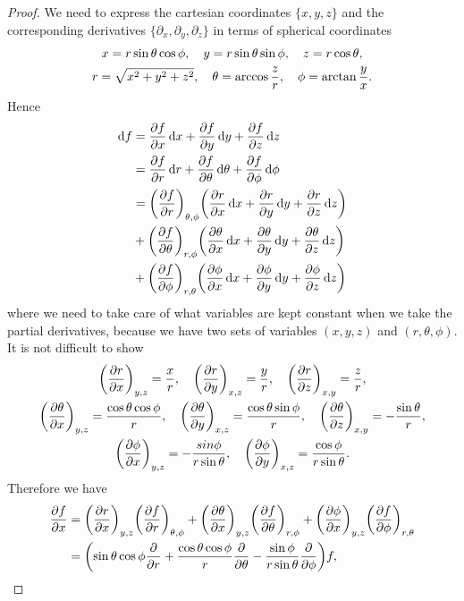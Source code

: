 \documentclass[10pt]{article}
\begin{document}
\begin{enumerate}[(a)]
	\begin{proof}
		We need to express the cartesian coordinates $\{x,y,z\}$ and the corresponding derivatives $\{\partial_x, \partial_y, \partial_z\}$ in terms of spherical coordinates
		\begin{gather*}
			x = r \sin{\theta} \cos{\phi}\qc y = r \sin{\theta}\sin{\phi}\qc z = r\cos{\theta}, \\
			r = \sqrt{x^2 + y^2 + z^2}\qc \theta = \arccos{\frac{z}{r}}\qc \phi = \arctan{\frac{y}{x}}.
		\end{gather*}
		Hence
		\begin{align*}
			\dd{f} &= \pdv{f}{x} \dd{x} + \pdv{f}{y} \dd{y} + \pdv{f}{z} \dd{z} \\
			&= \pdv{f}{r} \dd{r} + \pdv{f}{\theta} \dd{\theta} + \pdv{f}{\phi} \dd{\phi} \\
			&= \qty(\pdv{f}{r})_{\theta, \phi} \qty(\pdv{r}{x} \dd{x} + \pdv{r}{y} \dd{y} + \pdv{r}{z} \dd{z}) \\
			&+ \qty(\pdv{f}{\theta})_{r, \phi} \qty(\pdv{\theta}{x} \dd{x} + \pdv{\theta}{y} \dd{y} + \pdv{\theta}{z} \dd{z}) \\
			&+ \qty(\pdv{f}{\phi})_{r,\theta} \qty(\pdv{\phi}{x} \dd{x} + \pdv{\phi}{y} \dd{y} + \pdv{\phi}{z} \dd{z})
		\end{align*}
		where we need to take care of what variables are kept constant when we take the partial derivatives, because we have two sets of variables $(x,y,z)$ and $(r,\theta, \phi)$.
		It is not difficult to show
		\begin{gather*}
			\qty(\pdv{r}{x})_{y,z} = \frac{x}{r}\qc \qty(\pdv{r}{y})_{x,z} = \frac{y}{r}\qc \qty(\pdv{r}{z})_{x,y} = \frac{z}{r}, \\
			\qty(\pdv{\theta}{x})_{y,z} = \frac{\cos{\theta}\cos{\phi}}{r}\qc
			\qty(\pdv{\theta}{y})_{x,z} = \frac{\cos{\theta}\sin{\phi}}{r}\qc
			\qty(\pdv{\theta}{z})_{x,y} = -\frac{\sin{\theta}}{r}, \\
			\qty(\pdv{\phi}{x})_{y,z} = -\frac{sin{\phi}}{r\sin{\theta}}\qc \qty(\pdv{\phi}{y})_{x,z} = \frac{\cos{\phi}}{r\sin{\theta}}. \\
		\end{gather*}
		Therefore we have
		\begin{align*}
			\pdv{f}{x} &= \qty(\pdv{r}{x})_{y,z} \qty(\pdv{f}{r})_{\theta, \phi} +  \qty(\pdv{\theta}{x})_{y,z} \qty(\pdv{f}{\theta})_{r, \phi} +
			\qty(\pdv{\phi}{x})_{y,z} \qty(\pdv{f}{\phi})_{r,\theta} \\
			&= \qty(\sin{\theta}\cos{\phi} \pdv{r} + \frac{\cos{\theta}\cos{\phi}}{r} \pdv{\theta} - \frac{\sin{\phi}}{r\sin{\theta}} \pdv{\phi})f,\\

\end{align*}
\end{proof}
\end{enumerate}
\end{document}
